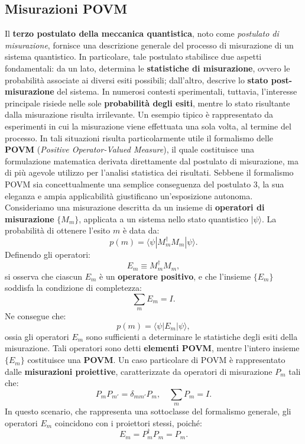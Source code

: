 \documentclass[a4paper,12pt]{report}
\theoremstyle{plain}
\begin{document}
\subsection{Misurazioni POVM}
Il \textbf{terzo postulato della meccanica quantistica}, noto come \textit{postulato di misurazione}, fornisce una descrizione generale del processo di misurazione di un sistema quantistico. In particolare, tale postulato stabilisce due aspetti fondamentali: da un lato, determina le \textbf{statistiche di misurazione}, ovvero le probabilità associate ai diversi esiti possibili; dall'altro, descrive lo \textbf{stato post-misurazione} del sistema. In numerosi contesti sperimentali, tuttavia, l'interesse principale risiede nelle sole \textbf{probabilità degli esiti}, mentre lo stato risultante dalla misurazione risulta irrilevante. Un esempio tipico è rappresentato da esperimenti in cui la misurazione viene effettuata una sola volta, al termine del processo.
In tali situazioni risulta particolarmente utile il formalismo delle \textbf{POVM} (\textit{Positive Operator-Valued Measure}), il quale costituisce una formulazione matematica derivata direttamente dal postulato di misurazione, ma di più agevole utilizzo per l'analisi statistica dei risultati. Sebbene il formalismo POVM sia concettualmente una semplice conseguenza del postulato 3, la sua eleganza e ampia applicabilità giustificano un'esposizione autonoma.
Consideriamo una misurazione descritta da un insieme di \textbf{operatori di misurazione} $\{M_m\}$, applicata a un sistema nello stato quantistico $|\psi\rangle$. La probabilità di ottenere l'esito $m$ è data da:
\[ p(m) = \langle\psi|M_m^\dagger M_m|\psi\rangle. \]
Definendo gli operatori:
\[ E_m \equiv M_m^\dagger M_m, \]
si osserva che ciascun $E_m$ è un \textbf{operatore positivo}, e che l'insieme $\{E_m\}$ soddisfa la condizione di completezza:
\[ \sum_m E_m = I. \]
Ne consegue che:
\[ p(m) = \langle\psi|E_m|\psi\rangle, \]
ossia gli operatori $E_m$ sono sufficienti a determinare le statistiche degli esiti della misurazione. Tali operatori sono detti \textbf{elementi POVM}, mentre l'intero insieme $\{E_m\}$ costituisce una \textbf{POVM}.
Un caso particolare di POVM è rappresentato dalle \textbf{misurazioni proiettive}, caratterizzate da operatori di misurazione $P_m$ tali che:
\[ P_m P_{m'} = \delta_{mm'} P_m, \quad \sum_m P_m = I. \]
In questo scenario, che rappresenta una sottoclasse del formalismo generale, gli operatori $E_m$ coincidono con i proiettori stessi, poiché:
\[ E_m = P_m^\dagger P_m = P_m. \]
\newpage
\end{document}
